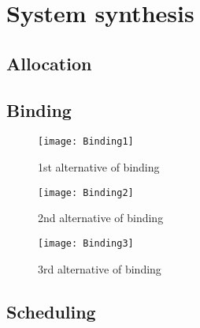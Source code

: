 \chapter{System synthesis}

\section{Allocation}

\section{Binding}

\begin{figure}[H]
\centering
\texttt{[image: Binding1]}
\caption{1st alternative of binding}
\label{fig:Binding1}
\end{figure}

\begin{figure}[H]
\centering
\texttt{[image: Binding2]}
\caption{2nd alternative of binding}
\label{fig:Binding2}
\end{figure}

\begin{figure}[H]
\centering
\texttt{[image: Binding3]}
\caption{3rd alternative of binding}
\label{fig:Binding3}
\end{figure}

\section{Scheduling}